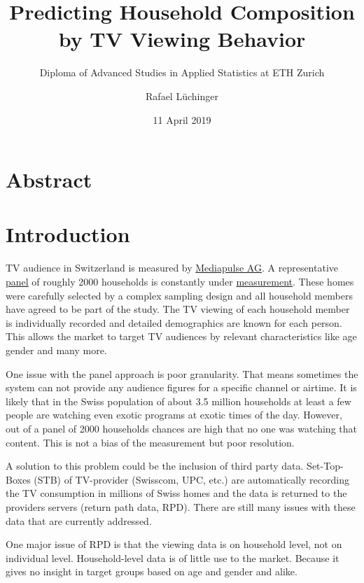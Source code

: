 \documentclass[]{article}
\title{Predicting Household Composition by TV Viewing Behavior}
\subtitle{Diploma of Advanced Studies in Applied Statistics at ETH Zurich}
\author{Rafael Lüchinger}
\date{11 April 2019}
\begin{document}
\maketitle

{
\setcounter{tocdepth}{2}
\tableofcontents
}
\hypertarget{abstract}{%
\section{Abstract}\label{abstract}}

\hypertarget{introduction}{%
\section{Introduction}\label{introduction}}

TV audience in Switzerland is measured by
\href{https:://www.mediapulse.ch/en}{Mediapulse AG}. A representative
\href{https:://www.mediapulse.ch/en/tv/research-method/the-panel.html}{panel}
of roughly 2000 households is constantly under
\href{https:://www.mediapulse.ch/en/tv/research-method/the-measuring-technique.html}{measurement}.
These homes were carefully selected by a complex sampling design and all
household members have agreed to be part of the study. The TV viewing of
each household member is individually recorded and detailed demographics
are known for each person. This allows the market to target TV audiences
by relevant characteristics like age gender and many more.

One issue with the panel approach is poor granularity. That means
sometimes the system can not provide any audience figures for a specific
channel or airtime. It is likely that in the Swiss population of about
3.5 million households at least a few people are watching even exotic
programs at exotic times of the day. However, out of a panel of 2000
households chances are high that no one was watching that content. This
is not a bias of the measurement but poor resolution.

A solution to this problem could be the inclusion of third party data.
Set-Top-Boxes (STB) of TV-provider (Swisscom, UPC, etc.) are
automatically recording the TV consumption in millions of Swiss homes
and the data is returned to the providers servers (return path data,
RPD). There are still many issues with these data that are currently
addressed.

One major issue of RPD is that the viewing data is on household level,
not on individual level. Household-level data is of little use to the
market. Because it gives no insight in target groups based on age and
gender and alike.
\end{document}
